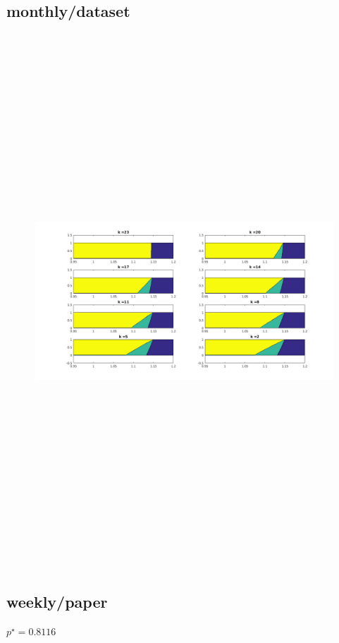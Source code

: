 \documentclass[]{article}
\begin{document}
\subsection{monthly/dataset}
\begin{figure}[H]
	\centering
	\includegraphics[width=18cm,height=20cm,keepaspectratio]{monthly.png}
\end{figure}
\subsection{weekly/paper}
$p^{\star} = 0.8116$
\end{document}

